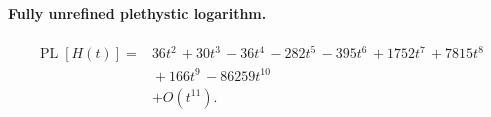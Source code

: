 \documentclass[10pt]{article}
\begin{document}
\paragraph{Fully unrefined plethystic logarithm.}
\[
\begin{aligned}
\operatorname{PL}[H(t)] ={}& 36t^{2}\,+30t^{3}\,-36t^{4}\,-282t^{5}\,-395t^{6}\,+1752t^{7}\,+7815t^{8} \\
  &{}+166t^{9}\,-86259t^{10} \\
  &+ O(t^{11}).
\end{aligned}
\]
\end{document}

